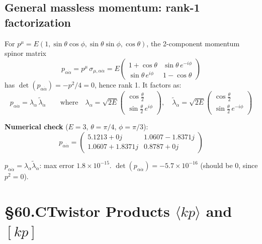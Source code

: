 \documentclass[12pt]{article}
\newcommand{\verified}[1]{\textcolor{verifygreen}{\checkmark\; #1}}
\begin{document}
\subsection{General massless momentum: rank-1 factorization}

For $p^\mu = E(1,\sin\theta\cos\phi,\sin\theta\sin\phi,\cos\theta)$, the
2-component momentum spinor matrix
\begin{equation}
  p_{\alpha\dot\alpha} = p^\mu\,\sigma_{\mu,\alpha\dot\alpha}
  = E\begin{pmatrix}1+\cos\theta & \sin\theta\,e^{-i\phi} \\
                   \sin\theta\,e^{i\phi} & 1-\cos\theta\end{pmatrix}
  \tag{60.4}
\end{equation}
has $\det(p_{\alpha\dot\alpha}) = -p^2/4 = 0$, hence rank 1.  It factors as:
\begin{equation}
  \boxed{
    p_{\alpha\dot\alpha} = \lambda_\alpha\,\tilde\lambda_{\dot\alpha}
  }
  \qquad \text{where}\quad
  \lambda_\alpha = \sqrt{2E}\!\begin{pmatrix}\cos\tfrac\theta2\\\sin\tfrac\theta2\,e^{i\phi}\end{pmatrix},
  \quad
  \tilde\lambda_{\dot\alpha} = \sqrt{2E}\!\begin{pmatrix}\cos\tfrac\theta2\\\sin\tfrac\theta2\,e^{-i\phi}\end{pmatrix}
  \tag{60.5}
\end{equation}

\textbf{Numerical check} ($E=3$, $\theta=\pi/4$, $\phi=\pi/3$):
\[
  p_{\alpha\dot\alpha} = \begin{pmatrix}5.1213+0j & 1.0607-1.8371j \\ 1.0607+1.8371j & 0.8787+0j\end{pmatrix}
\]

\verified{$p_{\alpha\dot\alpha} = \lambda_\alpha\tilde\lambda_{\dot\alpha}$: max error $1.8\times10^{-15}$.}
\verified{$\det(p_{\alpha\dot\alpha}) = -5.7\times10^{-16}$ (should be $0$, since $p^2=0$).}

\section{§60.C\quad Twistor Products $\langle kp\rangle$ and $[kp]$}
\end{document}
